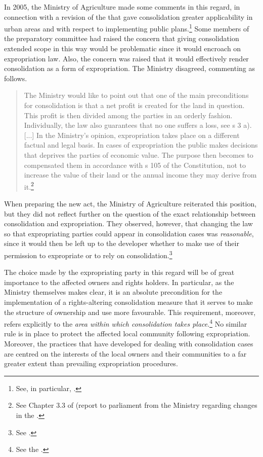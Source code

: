 In 2005, the Ministry of Agriculture made some comments in this regard, in connection with a revision of the \cite{lca79} that gave consolidation greater applicability in urban areas and with respect to implementing public plans.\footnote{See, in particular, \cite[2 h-i)]{lca79}.} Some members of the preparatory committee had raised the concern that giving consolidation extended scope in this way would be problematic since it would encroach on expropriation law. Also, the concern was raised that it would effectively render consolidation as a form of expropriation. The Ministry disagreed, commenting as follows.

\begin{quote}
The Ministry would like to point out that one of the main preconditions for consolidation is that a net profit is created for the land in question. This profit is then divided among the parties in an orderly fashion. Individually, the law also guarantees that no one suffers a loss, see s 3 a). [...] In the Ministry's opinion, expropriation takes place on a different factual and legal basis. In cases of expropriation the public makes decisions that deprives the parties of economic value. The purpose then becomes to compensated them in accordance with s 105 of the Constitution, not to increase the value of their land or the annual income they may derive from it.\footnote{See Chapter 3.3 of \cite{otprp78} (report to parliament from the Ministry regarding changes in the \cite{lca79}.}
\end{quote}

When preparing the new act, the Ministry of Agriculture reiterated this position, but they did not reflect further on the question of the exact relationship between consolidation and expropriation. They observed, however, that changing the law so that expropriating parties could appear in consolidation cases was \emph{reasonable}, since it would then be left up to the developer whether to make use of their permission to expropriate or to rely on consolidation.\footnote{See \cite[84]{prop12}.}

The choice made by the expropriating party in this regard will be of great importance to the affected owners and rights holders. In particular, as the Ministry themselves makes clear, it is an absolute precondition for the implementation of a rights-altering consolidation measure that it serves to make the structure of ownership and use more favourable. This requirement, moreover, refers explicitly to the \emph{area within which consolidation takes place}.\footnote{See the \cite[3-3]{lca13}.} No similar rule is in place to protect the affected local community following expropriation. Moreover, the practices that have developed for dealing with consolidation cases are centred on the interests of the local owners and their communities to a far greater extent than prevailing expropriation procedures.

